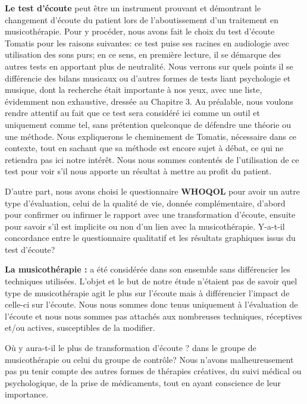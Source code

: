  
 \textbf { Le test d'écoute}  peut être un instrument prouvant et démontrant le changement d'écoute du 
 patient
 lors de l'aboutissement d'un traitement en musicothérapie.
 Pour y procéder, nous  avons fait le choix du test d'écoute Tomatis pour les raisons suivantes:  ce test 
 puise ses racines  en 
 audiologie avec utilisation des sons purs; en ce sens, en première lecture, il se démarque des autres 
 tests en apportant plus de neutralité. Nous verrons sur quels points il se différencie des bilans musicaux 
 ou 
 d'autres formes de tests liant psychologie et musique, dont la recherche était importante à nos yeux, 
 avec une liste, 
 évidemment non exhaustive, dressée au Chapitre 3. 
  Au préalable, nous voulons rendre attentif au fait que ce test sera considéré ici 
 comme un outil et uniquement comme tel, sans prétention quelconque de défendre une théorie ou une 
 méthode. Nous expliquerons le cheminement de Tomatis, nécessaire dans ce contexte, tout en  sachant 
 que sa méthode  est 
 encore sujet à débat, ce qui ne retiendra pas ici notre intérêt. Nous nous sommes contentés de 
 l'utilisation de ce test pour voir s'il nous apporte un résultat à mettre 
 au profit du patient.
 
 D'autre part, nous avons choisi le questionnaire \textbf {WHOQOL} pour avoir un autre type 
 d'évaluation, celui 
 de la qualité de vie, donnée complémentaire, d'abord  pour confirmer ou infirmer le rapport avec une  
 transformation d'écoute, ensuite pour savoir s'il est implicite  ou non d'un lien avec la musicothérapie.
 Y-a-t-il concordance entre  le questionnaire qualitatif  et les résultats graphiques issus du test d'écoute?
 
  \textbf{La musicothérapie :}  a été considérée dans son ensemble sans 
 différencier les 
 techniques utilisées.
  L'objet et le but de notre étude n'étaient pas de savoir quel  type de 
  musicothérapie 
  agit le plus sur l'écoute mais à différencier l'impact de celle-ci sur l'écoute. Nous nous sommes donc 
  tenus uniquement  à l'évaluation de l'écoute et nous nous sommes pas attachés  aux nombreuses 
  techniques, réceptives et/ou actives, susceptibles de la modifier.

 Où y aura-t-il le plus de transformation d'écoute ? dans le groupe de musicothérapie  ou celui du 
 groupe de contrôle?
 Nous n'avons malheureusement pas pu  tenir compte des autres for\-mes de thérapies créatives, du 
 suivi médical ou 
 psychologique, de 
 la prise de médicaments, tout en ayant conscience de leur importance.
 

